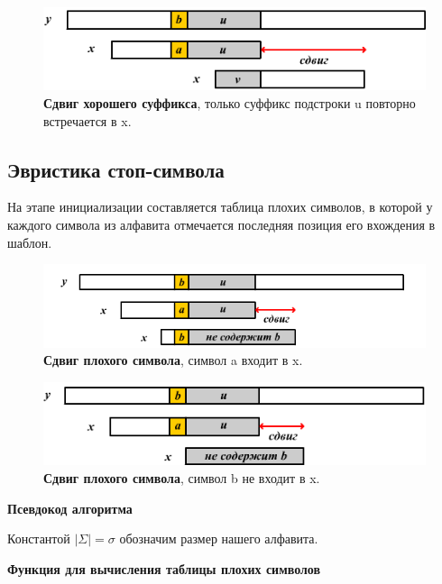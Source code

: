 \begin{figure}[h!]
	\centering
	\includegraphics[width=0.7\linewidth]{img/10_1.png}
	\captionsetup{labelformat=empty}
	\caption{\textbf{Сдвиг хорошего суффикса}, только суффикс подстроки u повторно встречается в x.}
\end{figure}


\subsection{Эвристика стоп-символа}

На этапе инициализации составляется таблица плохих символов, в которой у каждого символа из алфавита отмечается последняя позиция его вхождения в шаблон.


\begin{figure}[h!]
	\centering
	\includegraphics[width=0.7\linewidth]{img/10_3.png}
	\captionsetup{labelformat=empty}
	\caption{\textbf{Сдвиг плохого символа}, символ a входит в x.}
\end{figure}

\begin{figure}[h!]
	\centering
	\includegraphics[width=0.7\linewidth]{img/10_4.png}
	\captionsetup{labelformat=empty}
	\caption{\textbf{Сдвиг плохого символа}, символ b не входит в x.}
\end{figure}


\textbf{Псевдокод алгоритма}

Константой $|\Sigma| = \sigma$  обозначим размер нашего алфавита.

\textbf{Функция для вычисления таблицы плохих символов}

%
%
